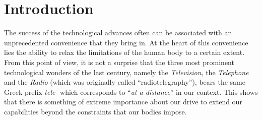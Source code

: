 
\chapter{Introduction}
\label{chap:intro}

The success of the technological advances often can be associated with an unprecedented convenience that they bring in. At the heart of 
this convenience lies the ability to relax the limitations of the human body to a certain extent. From this point of view, it is not a 
surprise that the three most prominent technological wonders of the last century, namely the \emph{Television}, the \emph{Telephone} and 
the \emph{Radio} (which was originally called \enquote{radiotelegraphy}), bears the same Greek prefix \emph{tele-} which corresponds to 
\enquote{\emph{at a distance}} in our context. This shows that there is something of extreme importance about our drive to extend our 
capabilities beyond the constraints that our bodies impose.


